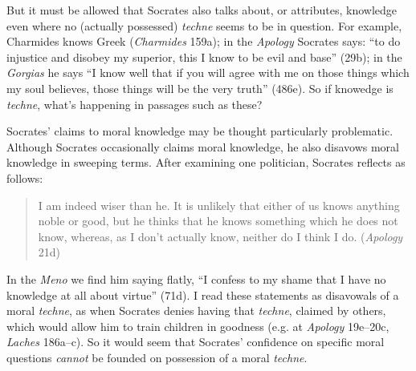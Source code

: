 ﻿\documentclass[11pt]{amsart}
\begin{document}







But it must be allowed that Socrates also talks about, or attributes, knowledge even where no (actually possessed) \emph{techne} seems to be in question. For example, Charmides knows Greek (\emph{Charmides} 159a); in the \emph{Apology} Socrates says: ``to do injustice and disobey my superior, this I know to be evil and base'' (29b); in the \emph{Gorgias} he says ``I know well that if you will agree with me on those things which my soul believes, those things will be the very truth'' (486e). So if knowedge is \emph{techne}, what's happening in passages such as these?







Socrates' claims to moral knowledge may be thought particularly problematic. Although Socrates occasionally claims moral knowledge, he also disavows moral knowledge in sweeping terms. After examining one politician, Socrates reflects as follows:\small\begin{quote}I am indeed wiser than he. It is unlikely that either of us knows anything noble or good, but he thinks that he knows something which he does not know, whereas, as I don't actually know, neither do I think I do. (\emph{Apology} 21d)\end{quote}\normalsize In the \emph{Meno} we find him saying flatly, ``I confess to my shame that I have no knowledge at all about virtue'' (71d). I read these statements as disavowals of a moral \emph{techne}, as when Socrates denies having that \emph{techne}, claimed by others, which would allow him to train children in goodness (e.g. at \emph{Apology} 19e--20c, \emph{Laches} 186a--c). So it would seem that Socrates' confidence on specific moral questions \emph{cannot} be founded on possession of a moral \emph{techne}.
\end{document}
